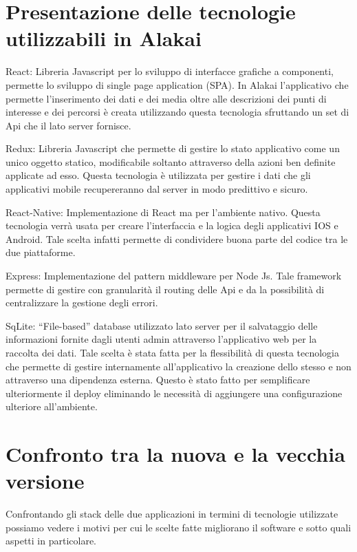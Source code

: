 \section{Presentazione delle tecnologie utilizzabili in Alakai}\vspace{5mm}
React: Libreria Javascript per lo sviluppo di interfacce grafiche a componenti, permette lo sviluppo di single page application (SPA). In Alakai l’applicativo che permette l’inserimento dei dati e dei media oltre alle descrizioni dei punti di interesse e dei percorsi è creata utilizzando questa tecnologia sfruttando un set di Api che il lato server fornisce.\vspace{5mm}

	Redux: Libreria Javascript che permette di gestire lo stato applicativo come un unico oggetto statico, modificabile soltanto attraverso della azioni ben definite applicate ad esso. Questa tecnologia è utilizzata per gestire i dati che gli applicativi mobile recupereranno dal server in modo predittivo e sicuro.\vspace{5mm}\vspace{5mm}

	React-Native: Implementazione di React ma per l’ambiente nativo. Questa tecnologia verrà usata per creare l’interfaccia e la logica degli applicativi IOS e Android. Tale scelta infatti permette di condividere buona parte del codice tra le due piattaforme.\vspace{5mm}

	Express: Implementazione del pattern middleware per Node Js. Tale framework permette di gestire con granularità il routing delle Api e da la possibilità di centralizzare la gestione degli errori.\vspace{5mm}

	SqLite: “File-based” database utilizzato lato server per il salvataggio delle informazioni fornite dagli utenti admin attraverso l’applicativo web per la raccolta dei dati. Tale scelta è stata fatta per la flessibilità di questa tecnologia che permette di gestire internamente all’applicativo la creazione dello stesso e non attraverso una dipendenza esterna. Questo è stato fatto per semplificare ulteriormente il deploy eliminando le necessità di aggiungere una configurazione ulteriore all’ambiente.\vspace{5mm}
	
	\section{Confronto tra la nuova e la vecchia versione}\vspace{5mm}
	Confrontando gli stack delle due applicazioni in termini di tecnologie utilizzate possiamo vedere i motivi per cui le scelte fatte migliorano il software e sotto quali aspetti in particolare. \vspace{5mm}

